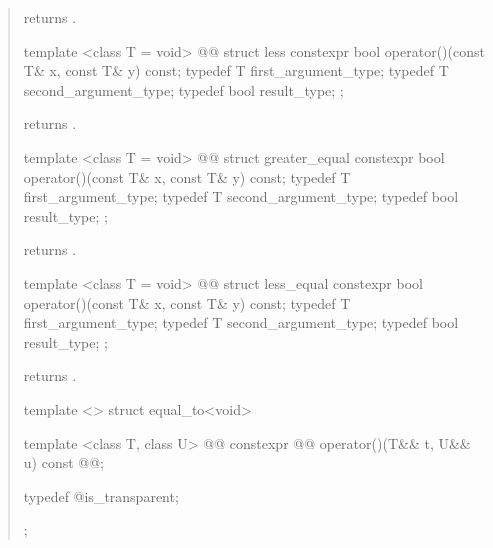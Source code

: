 \begin{quote}
\begin{itemdescr}
\pnum
{} returns .
\end{itemdescr}

%
\begin{itemdecl}
template <class T = void>
  @@
struct less {
  constexpr bool operator()(const T& x, const T& y) const;
  typedef T first_argument_type;
  typedef T second_argument_type;
  typedef bool result_type;
};
\end{itemdecl}

\begin{itemdescr}
\pnum
{} returns .
\end{itemdescr}

%
\begin{itemdecl}
template <class T = void>
  @@
struct greater_equal {
  constexpr bool operator()(const T& x, const T& y) const;
  typedef T first_argument_type;
  typedef T second_argument_type;
  typedef bool result_type;
};
\end{itemdecl}

\begin{itemdescr}
\pnum
{} returns .
\end{itemdescr}

%
\begin{itemdecl}
template <class T = void>
  @@
struct less_equal {
  constexpr bool operator()(const T& x, const T& y) const;
  typedef T first_argument_type;
  typedef T second_argument_type;
  typedef bool result_type;
};
\end{itemdecl}

\begin{itemdescr}
\pnum
{} returns .
\end{itemdescr}

%
\begin{itemdecl}
template <> struct equal_to<void> {
  template <class T, class U>
    @@
  constexpr @@ operator()(T&& t, U&& u) const
    @@;

  typedef @\unspec@ is_transparent;
};
\end{itemdecl}


\end{quote}
